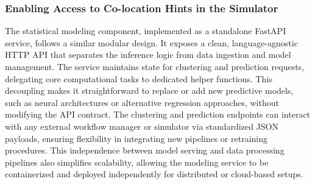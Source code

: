 \subsubsection{Enabling Access to Co-location Hints in the Simulator}
\label{sec:statistical_modeling}
The statistical modeling component, implemented as a standalone FastAPI service, follows a similar modular design. It exposes a clean, language-agnostic HTTP API that separates the inference logic from data ingestion and model management. The service maintains state for clustering and prediction requests, delegating core computational tasks to dedicated helper functions. This decoupling makes it straightforward to replace or add new predictive models, such as neural architectures or alternative regression approaches, without modifying the API contract. The clustering and prediction endpoints can interact with any external workflow manager or simulator via standardized JSON payloads, ensuring flexibility in integrating new pipelines or retraining procedures. This independence between model serving and data processing pipelines also simplifies scalability, allowing the modeling service to be containerized and deployed independently for distributed or cloud-based setups.


